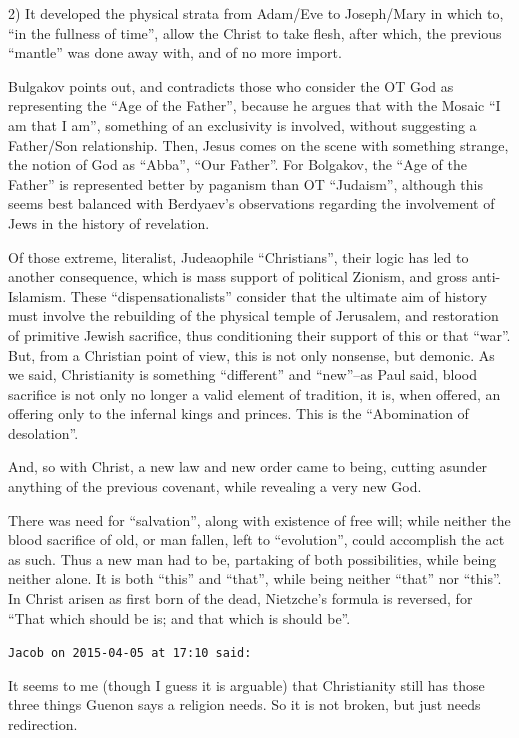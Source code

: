 \begin{footnotesize}
\begin{sffamily}
2) It developed the physical strata from Adam/Eve to Joseph/Mary in which to, ``in the fullness of time'', allow the Christ to take flesh, after which, the previous ``mantle'' was done away with, and of no more import.

Bulgakov points out, and contradicts those who consider the OT God as representing the ``Age of the Father'', because he argues that with the Mosaic ``I am that I am'', something of an exclusivity is involved, without suggesting a Father/Son relationship. Then, Jesus comes on the scene with something strange, the notion of God as ``Abba'', ``Our Father''. For Bolgakov, the ``Age of the Father'' is represented better by paganism than OT ``Judaism'', although this seems best balanced with Berdyaev's observations regarding the involvement of Jews in the history of revelation.

Of those extreme, literalist, Judeaophile ``Christians'', their logic has led to another consequence, which is mass support of political Zionism, and gross anti-Islamism. These ``dispensationalists'' consider that the ultimate aim of history must involve the rebuilding of the physical temple of Jerusalem, and restoration of primitive Jewish sacrifice, thus conditioning their support of this or that ``war''. But, from a Christian point of view, this is not only nonsense, but demonic. As we said, Christianity is something ``different'' and ``new''--as Paul said, blood sacrifice is not only no longer a valid element of tradition, it is, when offered, an offering only to the infernal kings and princes. This is the ``Abomination of desolation''.

And, so with Christ, a new law and new order came to being, cutting asunder anything of the previous covenant, while revealing a very new God.

There was need for ``salvation'', along with existence of free will; while neither the blood sacrifice of old, or man fallen, left to ``evolution'', could accomplish the act as such. Thus a new man had to be, partaking of both possibilities, while being neither alone. It is both ``this'' and ``that'', while being neither ``that'' nor ``this''. In Christ arisen as first born of the dead, Nietzche's formula is reversed, for ``That which should be is; and that which is should be''.

\hfill

\texttt{Jacob on 2015-04-05 at 17:10 said:}

It seems to me (though I guess it is arguable) that Christianity still has those three things Guenon says a religion needs. So it is not broken, but just needs redirection.


\end{sffamily}
\end{footnotesize}
